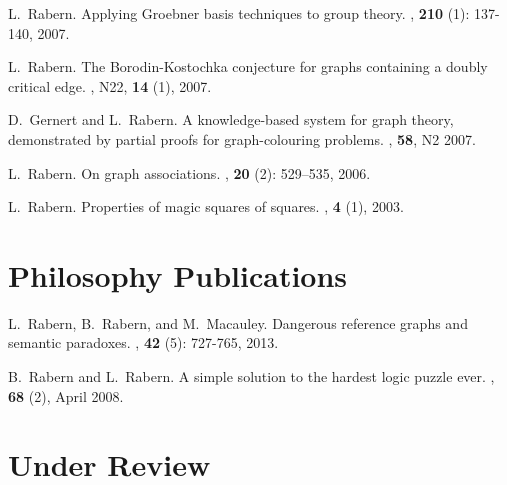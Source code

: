 \documentclass[margin,line]{res}
\begin{document}
\begin{resume}
\begin{enumerate}[{[}1{]}]
\smallskip

\item L.~Rabern.
\newblock Applying Groebner basis techniques to group theory.
, \textbf{210} (1): 137-140, 2007.

\smallskip

\item
L.~Rabern.
\newblock The Borodin-Kostochka conjecture for graphs containing a doubly critical edge.
, N22, \textbf{14} (1), 2007.

\smallskip

\item
D.~Gernert and L.~Rabern.
\newblock A knowledge-based system for graph theory, demonstrated by partial proofs for graph-colouring problems.
, \textbf{58}, N2 2007.

\smallskip

\item L.~Rabern.
\newblock On graph associations.
, \textbf{20}  (2): 529--535,
  2006.

\smallskip

\item L.~Rabern.
\newblock Properties of magic squares of squares.
, \textbf{4}
  (1), 2003. 

\end{enumerate}

\section{\sc Philosophy Publications}
\begin{enumerate}[{[}1{]}]
	\setcounter{enumi}{29}
\item
L.~Rabern, B.~Rabern, and M.~Macauley.
\newblock Dangerous reference graphs and semantic paradoxes.
, \textbf{42} (5): 727-765, 2013.

\smallskip

\item
B.~Rabern and L.~Rabern.
\newblock A simple solution to the hardest logic puzzle ever. 
, \textbf{68} (2), April 2008.

\end{enumerate}
\section{\sc Under Review}


\end{resume}
\end{document}
